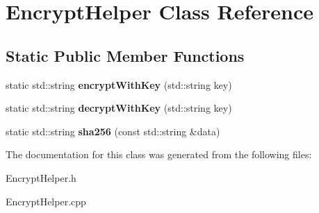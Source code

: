 \hypertarget{class_encrypt_helper}{}\section{Encrypt\+Helper Class Reference}
\label{class_encrypt_helper}
\subsection*{Static Public Member Functions}
\begin{DoxyCompactItemize}
\item 
\mbox{\label{class_encrypt_helper_a44efdf745ff59ae7b5836a900793572a}} 
static std\+::string {\bfseries encrypt\+With\+Key} (std\+::string key)
\item 
\mbox{\label{class_encrypt_helper_a5697d809294210356a3efa38a562cf3b}} 
static std\+::string {\bfseries decrypt\+With\+Key} (std\+::string key)
\item 
\mbox{\label{class_encrypt_helper_ac5bd13cbe34e13a1126a695771a48cba}} 
static std\+::string {\bfseries sha256} (const std\+::string \&data)
\end{DoxyCompactItemize}


The documentation for this class was generated from the following files\+:\begin{DoxyCompactItemize}
\item 
Encrypt\+Helper.\+h\item 
Encrypt\+Helper.\+cpp\end{DoxyCompactItemize}
